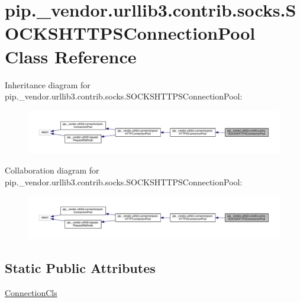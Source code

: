 \hypertarget{classpip_1_1__vendor_1_1urllib3_1_1contrib_1_1socks_1_1SOCKSHTTPSConnectionPool}{}\section{pip.\+\_\+vendor.\+urllib3.\+contrib.\+socks.\+S\+O\+C\+K\+S\+H\+T\+T\+P\+S\+Connection\+Pool Class Reference}
\label{classpip_1_1__vendor_1_1urllib3_1_1contrib_1_1socks_1_1SOCKSHTTPSConnectionPool}


Inheritance diagram for pip.\+\_\+vendor.\+urllib3.\+contrib.\+socks.\+S\+O\+C\+K\+S\+H\+T\+T\+P\+S\+Connection\+Pool\+:
\nopagebreak
\begin{figure}[H]
\begin{center}
\leavevmode
\includegraphics[width=350pt]{classpip_1_1__vendor_1_1urllib3_1_1contrib_1_1socks_1_1SOCKSHTTPSConnectionPool__inherit__graph}
\end{center}
\end{figure}


Collaboration diagram for pip.\+\_\+vendor.\+urllib3.\+contrib.\+socks.\+S\+O\+C\+K\+S\+H\+T\+T\+P\+S\+Connection\+Pool\+:
\nopagebreak
\begin{figure}[H]
\begin{center}
\leavevmode
\includegraphics[width=350pt]{classpip_1_1__vendor_1_1urllib3_1_1contrib_1_1socks_1_1SOCKSHTTPSConnectionPool__coll__graph}
\end{center}
\end{figure}
\subsection*{Static Public Attributes}
\begin{DoxyCompactItemize}
\item 
\hyperlink{classpip_1_1__vendor_1_1urllib3_1_1contrib_1_1socks_1_1SOCKSHTTPSConnectionPool_a98ea21c99c2096a636e823719b8dabd6}{Connection\+Cls}
\end{DoxyCompactItemize}
